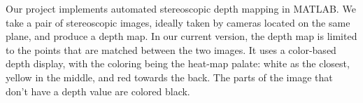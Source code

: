 Our project implements automated stereoscopic depth mapping in MATLAB.  We take a pair of stereoscopic images, ideally taken by cameras located on the same plane, and produce a depth map.  In our current version, the depth map is limited to the points that are matched between the two images.  It uses a color-based depth display, with the coloring being the heat-map palate: white as the closest, yellow in the middle, and red towards the back.  The parts of the image that don't have a depth value are colored black.